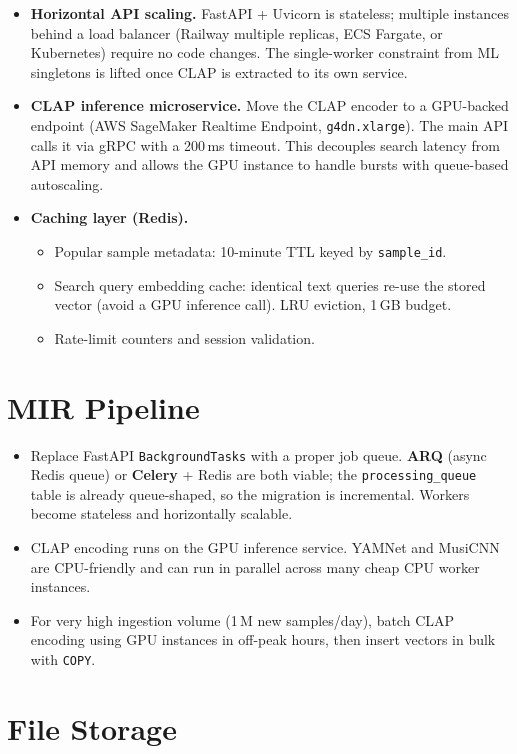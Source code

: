 \documentclass[12pt,letterpaper]{report}
\begin{document}
\begin{itemize}
  \item \textbf{Horizontal API scaling.} FastAPI + Uvicorn is stateless; multiple instances behind a load balancer (Railway multiple replicas, ECS Fargate, or Kubernetes) require no code changes. The single-worker constraint from ML singletons is lifted once CLAP is extracted to its own service.
  \item \textbf{CLAP inference microservice.} Move the CLAP encoder to a GPU-backed endpoint (AWS SageMaker Realtime Endpoint, \texttt{g4dn.xlarge}). The main API calls it via gRPC with a 200\,ms timeout. This decouples search latency from API memory and allows the GPU instance to handle bursts with queue-based autoscaling.
  \item \textbf{Caching layer (Redis).}
  \begin{itemize}
    \item Popular sample metadata: 10-minute TTL keyed by \texttt{sample\_id}.
    \item Search query embedding cache: identical text queries re-use the stored vector (avoid a GPU inference call). LRU eviction, 1\,GB budget.
    \item Rate-limit counters and session validation.
  \end{itemize}
\end{itemize}

\section{MIR Pipeline}

\begin{itemize}
  \item Replace FastAPI \texttt{BackgroundTasks} with a proper job queue. \textbf{ARQ} (async Redis queue) or \textbf{Celery} + Redis are both viable; the \texttt{processing\_queue} table is already queue-shaped, so the migration is incremental. Workers become stateless and horizontally scalable.
  \item CLAP encoding runs on the GPU inference service. YAMNet and MusiCNN are CPU-friendly and can run in parallel across many cheap CPU worker instances.
  \item For very high ingestion volume (1\,M new samples/day), batch CLAP encoding using GPU instances in off-peak hours, then insert vectors in bulk with \texttt{COPY}.
\end{itemize}

\section{File Storage}
\end{document}
